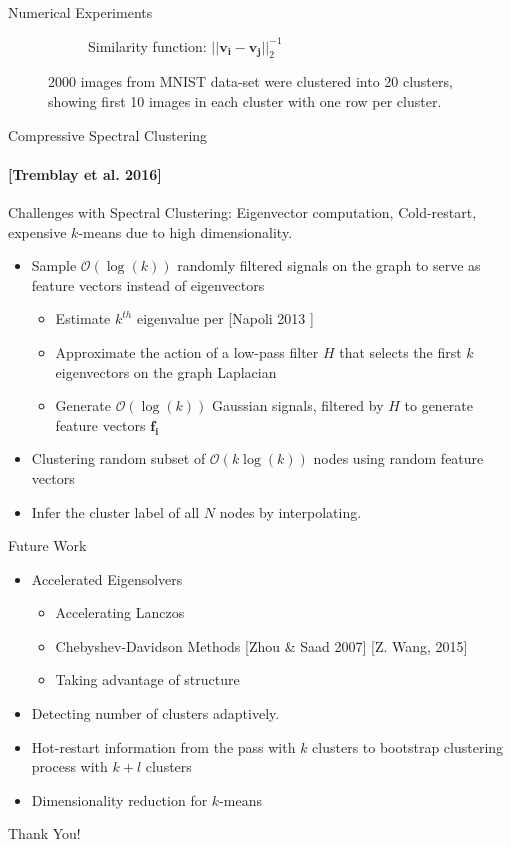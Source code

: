 \documentclass[10pt,a4paper, nocenter]{beamer}
\begin{document}
\begin{frame}{Numerical Experiments}
\begin{figure}[h]
\begin{center}
\begin{subfigure}[b]{0.4\textwidth}
					\caption{Similarity function: $\lvert \lvert \mathbf{v_i} - \mathbf{v_j} \rvert \rvert_2^{-1}$}
					\label{fig:clustering_20_2norm}
				\end{subfigure}
			\end{center}
			\caption{2000 images from MNIST data-set were clustered into 20 clusters, showing first 10 images in each cluster with one row per cluster. }
			\label{fig:mnistImages}
		\end{figure}
	\end{frame}
	
	\begin{frame}{Compressive Spectral Clustering}
		\framesubtitle{[Tremblay et al. 2016]}
		Challenges with Spectral Clustering: Eigenvector computation, Cold-restart, expensive $k$-means due to high dimensionality.
		\begin{itemize}
			\item<2-> Sample $\mathcal{O}(\log(k))$ randomly filtered signals on the graph to serve as feature vectors instead of eigenvectors
			\begin{itemize}
				\item Estimate $k^{th}$ eigenvalue per [Napoli 2013	]
				\item Approximate the action of a low-pass filter $H$ that selects the first $k$ eigenvectors on the graph Laplacian
				\item Generate $\mathcal{O}(\log(k))$ Gaussian signals, filtered by $H$ to generate feature vectors $\mathbf{f_i}$
			\end{itemize}
			\item<3-> Clustering random subset of $\mathcal{O}(k\log(k))$ nodes using random feature vectors 
			\item<4-> Infer the cluster label of all $N$ nodes by interpolating. 
		\end{itemize}
		
	\end{frame}

	\begin{frame}{Future Work}
		\begin{itemize}
			\item Accelerated Eigensolvers
			\begin{itemize}
				\item Accelerating Lanczos
				\item Chebyshev-Davidson Methods	 [Zhou \& Saad 2007] [Z. Wang, 2015]
				\item Taking advantage of structure				
			\end{itemize}
			\item Detecting number of clusters adaptively.
			\item Hot-restart information from the pass with $k$ clusters to bootstrap clustering process with $k+l$ clusters 
			\item Dimensionality reduction for $k$-means
		\end{itemize}
	\end{frame}
	
	\begin{frame}
		\centering
		Thank You!
		
	\end{frame}
	 
\end{document}

